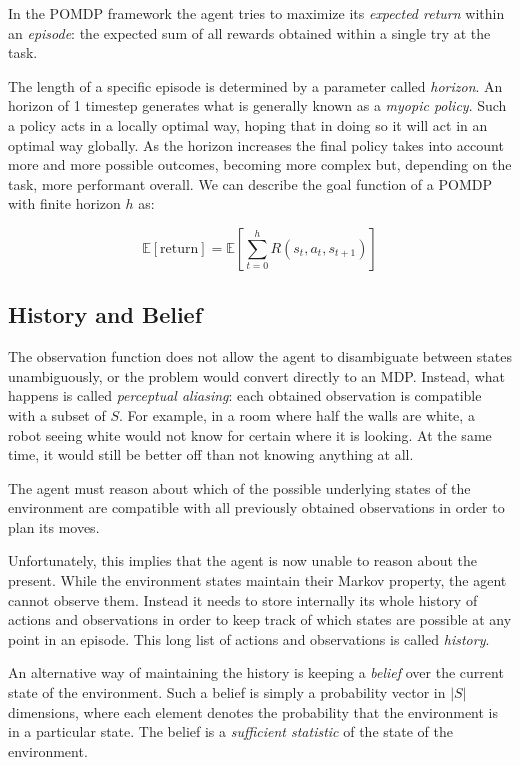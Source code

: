 In the POMDP framework the agent tries to maximize its \textit{expected return} within an
\textit{episode}: the expected sum of all rewards obtained within a single try at the task.

The length of a specific episode is determined by a parameter called \textit{horizon}. An horizon of
1 timestep generates what is generally known as a \textit{myopic policy}. Such a policy acts in a
locally optimal way, hoping that in doing so it will act in an optimal way globally. As the horizon
increases the final policy takes into account more and more possible outcomes, becoming more complex
but, depending on the task, more performant overall. We can describe the goal function of a POMDP
with finite horizon $h$ as:

\[ \mathbb{E}[\text{return}] = \mathbb{E} \left [ \sum_{t=0}^{h} R(s_t, a_t, s_{t+1}) \right ] \]

\subsection{History and Belief}

The observation function does not allow the agent to disambiguate between states unambiguously, or
the problem would convert directly to an MDP. Instead, what happens is called \textit{perceptual
aliasing}: each obtained observation is compatible with a subset of $S$. For example, in a room
where half the walls are white, a robot seeing white would not know for certain where it is looking.
At the same time, it would still be better off than not knowing anything at all.

The agent must reason about which of the possible underlying states of the environment are
compatible with all previously obtained observations in order to plan its moves.

Unfortunately, this implies that the agent is now unable to reason about the present. While the
environment states maintain their Markov property, the agent cannot observe them. Instead it needs
to store internally its whole history of actions and observations in order to keep track of which
states are possible at any point in an episode. This long list of actions and observations is called
\textit{history}.

An alternative way of maintaining the history is keeping a \textit{belief} over the current state of
the environment. Such a belief is simply a probability vector in $|S|$ dimensions, where each
element denotes the probability that the environment is in a particular state. The belief is a
\textit{sufficient statistic} of the state of the environment.

